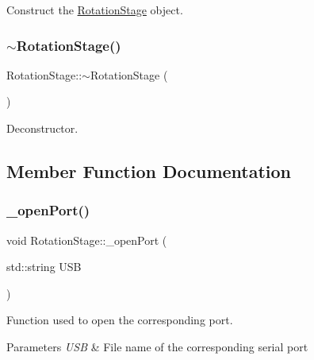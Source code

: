 Construct the \hyperlink{class_rotation_stage}{Rotation\+Stage} object. 

\mbox{\label{class_rotation_stage_a3023bae2d8de9f084036de453d8ac374}} 
\subsubsection{\texorpdfstring{$\sim$\+Rotation\+Stage()}{~RotationStage()}}
{\footnotesize\ttfamily Rotation\+Stage\+::$\sim$\+Rotation\+Stage (\begin{DoxyParamCaption}{ }\end{DoxyParamCaption})\hspace{0.3cm}{\ttfamily [inline]}}



Deconstructor. 



\subsection{Member Function Documentation}
\mbox{\label{class_rotation_stage_a8c120bd6de719b9aee263b421850bdaf}} 
\subsubsection{\texorpdfstring{\+\_\+open\+Port()}{\_openPort()}}
{\footnotesize\ttfamily void Rotation\+Stage\+::\+\_\+open\+Port (\begin{DoxyParamCaption}\item[{std\+::string}]{U\+SB }\end{DoxyParamCaption})\hspace{0.3cm}{\ttfamily [private]}}



Function used to open the corresponding port. 


\begin{DoxyParams}{Parameters}
{\em U\+SB} & File name of the corresponding serial port \\
\hline
\end{DoxyParams}
\mbox{\label{class_rotation_stage_afb2393a3cac78176407e8e2d31a6cef4}} 
